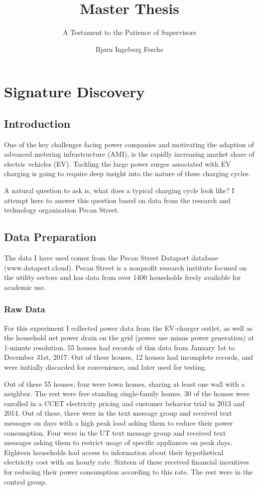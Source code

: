 \documentclass[12pt, american]{report}
\title{Master Thesis}
\subtitle{A Testament to the Patience of Supervisors}
\author{Bjørn Ingeberg Fesche}
\begin{document}
\duoforside[dept={Institutt for informatikk},
program={Informatikk: Programmering og nettverk},
long]
\chapter{Signature Discovery}
\section{Introduction}
One of the key challenges facing power companies and motivating the adaption of advanced metering infrastructure (AMI), is the rapidly increasing market share of electric vehicles (EV). Tackling the large power surges associated with EV charging is going to require deep insight into the nature of these charging cycles.

A natural question to ask is, what does a typical charging cycle look like? I attempt here to answer this question based on data from the research and technology organization Pecan Street.

\section{Data Preparation}
The data I have used comes from the Pecan Street Dataport database (www.dataport.cloud). Pecan Street is a nonprofit research institute focused on the utility sectors and has data from over 1400 households freely available for academic use.

\subsection{Raw Data}
For this experiment I collected power data from the EV-charger outlet, as well as the household net power drain on the grid (power use minus power generation) at 1-minute resolution. 55 houses had records of this data from January 1st to December 31st, 2017. Out of these houses, 12 houses had incomplete records, and were initially discarded for convenience, and later used for testing.

Out of these 55 houses, four were town homes, sharing at least one wall with a neighbor. The rest were free standing single-family homes. 30 of the houses were enrolled in a CCET electricity pricing and customer behavior trial in 2013 and 2014. Out of these, three were in the text message group and received text messages on days with a high peak load asking them to reduce their power consumption. Four were in the UT text message group and received text messages asking them to restrict usage of specific appliances on peak days. Eighteen households had access to information about their hypothetical electricity cost with an hourly rate. Sixteen of these received financial incentives for reducing their power consumption according to this rate. The rest were in the control group.
\end{document}
